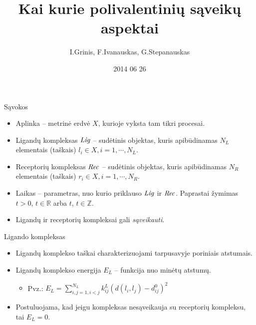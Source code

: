 \documentclass[11pt]{beamer}
\author{I.Grinis, F.Ivanauskas, G.Stepanauskas}
\title{Kai kurie polivalentinių sąveikų aspektai}
\institute{VU MIF}
\date{2014 06 26}
\begin{document}
\begin{frame}
\titlepage
\end{frame}

\begin{frame}
\tableofcontents
\end{frame}


\begin{frame}{Sąvokos}
\begin{itemize}
\item Aplinka -- metrinė erdvė $X$, kurioje vyksta tam tikri procesai.
\item Ligandų kompleksas $\mbox{\textit{Lig}}$ -- sudėtinis objektas, kuris apibūdinamas $N_L$ elementais (taškais)   $l_i \in X, i=1,\cdots, N_L$.
\item Receptorių  kompleksas $\mbox{\textit{Rec}}$ -- sudėtinis objektas, kuris apibūdinamas $N_R$ elementais (taškais) $ r_i \in X, i=1, \cdots, N_R$. 
\item Laikas -- parametras, nuo kurio priklauso $\mbox{\textit{Lig}}$ ir $\mbox{\textit{Rec}}$. Paprastai žymimas $t>0$, $t \in \mathbb{R}$ arba $t$, $t \in \mathbb{Z}$.
\item Ligandų ir receptorių kompleksai gali \textit{sąveikauti}.
\end{itemize}
\end{frame}


\begin{frame}{Ligando kompleksas}
\begin{itemize}
\item Ligandų komplekso taškai charakterizuojami tarpusavyje poriniais atstumais.
\item Ligandų komplekso energija $E_L$  -- funkcija nuo minėtų atstumų.
    \begin{itemize}
       \item Pvz.: $E_L = \sum\limits_{i,j=1,i<j}^{N_L} k_{ij}^L (d(l_i,l_j) - d_{ij}^0)^{2} $
    \end{itemize}
\item Postuluojama, kad jeigu kompleksas nesąveikauja su receptorių kompleksu, tai $E_L = 0$.
\end{itemize}
\end{frame}

\end{document}
